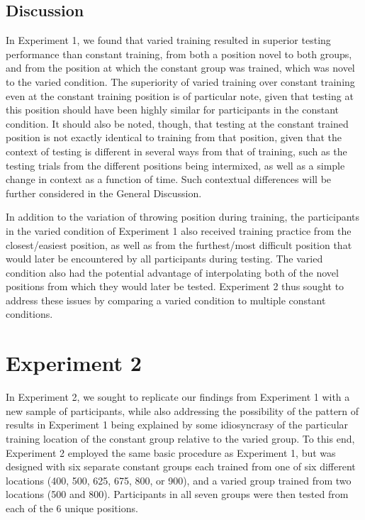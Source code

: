 \documentclass[
  jou, donotrepeattitle,floatsintext]{apa7}
\begin{document}
\hypertarget{discussion}{%
\subsection{Discussion}\label{discussion}}

In Experiment 1, we found that varied training resulted in superior testing performance than constant training, from both a position novel to both groups, and from the position at which the constant group was trained, which was novel to the varied condition. The superiority of varied training over constant training even at the constant training position is of particular note, given that testing at this position should have been highly similar for participants in the constant condition. It should also be noted, though, that testing at the constant trained position is not exactly identical to training from that position, given that the context of testing is different in several ways from that of training, such as the testing trials from the different positions being intermixed, as well as a simple change in context as a function of time. Such contextual differences will be further considered in the General Discussion.

In addition to the variation of throwing position during training, the participants in the varied condition of Experiment 1 also received training practice from the closest/easiest position, as well as from the furthest/most difficult position that would later be encountered by all participants during testing. The varied condition also had the potential advantage of interpolating both of the novel positions from which they would later be tested. Experiment 2 thus sought to address these issues by comparing a varied condition to multiple constant conditions.

\hypertarget{experiment-2}{%
\section{Experiment 2}\label{experiment-2}}

In Experiment 2, we sought to replicate our findings from Experiment 1 with a new sample of participants, while also addressing the possibility of the pattern of results in Experiment 1 being explained by some idiosyncrasy of the particular training location of the constant group relative to the varied group. To this end, Experiment 2 employed the same basic procedure as Experiment 1, but was designed with six separate constant groups each trained from one of six different locations (400, 500, 625, 675, 800, or 900), and a varied group trained from two locations (500 and 800). Participants in all seven groups were then tested from each of the 6 unique positions.
\end{document}
